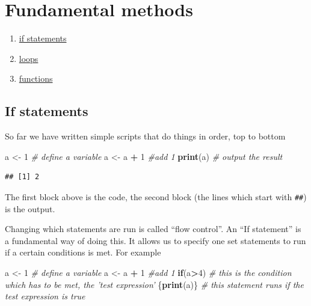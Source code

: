 \documentclass[]{book}
\newenvironment{Shaded}{\begin{snugshade}}{\end{snugshade}}
\newcommand{\KeywordTok}[1]{\textcolor[rgb]{0.13,0.29,0.53}{\textbf{#1}}}
\newcommand{\DecValTok}[1]{\textcolor[rgb]{0.00,0.00,0.81}{#1}}
\newcommand{\StringTok}[1]{\textcolor[rgb]{0.31,0.60,0.02}{#1}}
\newcommand{\CommentTok}[1]{\textcolor[rgb]{0.56,0.35,0.01}{\textit{#1}}}
\newcommand{\ControlFlowTok}[1]{\textcolor[rgb]{0.13,0.29,0.53}{\textbf{#1}}}
\newcommand{\OperatorTok}[1]{\textcolor[rgb]{0.81,0.36,0.00}{\textbf{#1}}}
\newcommand{\NormalTok}[1]{#1}
\providecommand{\tightlist}{%
  \setlength{\itemsep}{0pt}\setlength{\parskip}{0pt}}
\begin{document}
\section{Fundamental methods}\label{fundamental-methods}

\begin{enumerate}
\def\labelenumi{\arabic{enumi}.}
\tightlist
\item
  \protect\hyperlink{if}{if statements}
\item
  \protect\hyperlink{loops}{loops}
\item
  \protect\hyperlink{functions}{functions}
\end{enumerate}

\hypertarget{if}{\subsection{If statements}\label{if}}

So far we have written simple scripts that do things in order, top to
bottom

\begin{Shaded}
\begin{Highlighting}[]
\NormalTok{a <-}\StringTok{ }\DecValTok{1} \CommentTok{# define a variable}
\NormalTok{a <-}\StringTok{ }\NormalTok{a }\OperatorTok{+}\StringTok{ }\DecValTok{1} \CommentTok{#add 1}
\KeywordTok{print}\NormalTok{(a) }\CommentTok{# output the result}
\end{Highlighting}
\end{Shaded}

\begin{verbatim}
## [1] 2
\end{verbatim}

The first block above is the code, the second block (the lines which
start with \texttt{\#\#}) is the output.

Changing which statements are run is called ``flow control''. An ``If
statement'' is a fundamental way of doing this. It allows us to specify
one set statements to run if a certain conditions is met. For example

\begin{Shaded}
\begin{Highlighting}[]
\NormalTok{a <-}\StringTok{ }\DecValTok{1} \CommentTok{# define a variable}
\NormalTok{a <-}\StringTok{ }\NormalTok{a }\OperatorTok{+}\StringTok{ }\DecValTok{1} \CommentTok{#add 1}
\ControlFlowTok{if}\NormalTok{(a}\OperatorTok{>}\DecValTok{4}\NormalTok{) }\CommentTok{# this is the condition which has to be met, the 'test expression'}
\NormalTok{  \{}\KeywordTok{print}\NormalTok{(a)\} }\CommentTok{# this statement runs if the test expression is true}
\end{Highlighting}
\end{Shaded}
\end{document}
